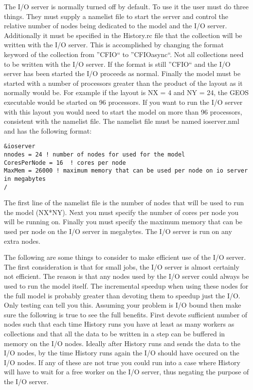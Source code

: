 The I/O server is normally turned off by default. To use it the user must do three things.
They must supply a namelist file to start the server and control the relative number of nodes being dedicated to the model and the I/O server.
Additionally it must be specified in the History.rc file that the collection will be written with the I/O server.
This is accomplished by changing the format keyword of the collection from ''CFIO`` to ''CFIOasync``.
Not all collections need to be written with the I/O server. If the format is still ''CFIO`` and the I/O server has been started the I/O proceeds as normal.
Finally the model must be started with a number of processors greater than the product of the layout as it normally would be.
For example if the layout is NX = 4 and NY = 24, the GEOS executable would be started on 96 processors.
If you want to run the I/O server with this layout you would need to start the model on more than 96 processors, consistent with the namelist file.
The namelist file must be named ioserver.nml and has the following format:
\begin{verbatim}
&ioserver
nnodes = 24 ! number of nodes for used for the model
CoresPerNode = 16  ! cores per node
MaxMem = 26000 ! maximum memory that can be used per node on io server in megabytes
/
\end{verbatim}
The first line of the namelist file is the number of nodes that will be used to run the model (NX*NY).
Next you must specify the number of cores per node you will be running on.
Finally you must specify the maximum memory that can be used per node on the I/O server in megabytes.
The I/O server is run on any extra nodes.

The following are some things to consider to make efficient use of the I/O server.
The first consideration is that for small jobs, the I/O server is almost certainly not efficient.
The reason is that any nodes used by the I/O server could always be used to run the model itself. The incremental speedup when using these nodes for the full model is probably greater than devoting them to speedup just the I/O.
Only testing can tell you this.
Assuming your problem is I/O bound then make sure the following is true to see the full benefits.
First devote sufficient number of nodes such that each time History runs you have at least as many workers as collections and that all the data to be written in a step can be buffered in memory on the I/O nodes. Ideally after History runs and sends the data to the I/O nodes, by the time History runs again the I/O should have occured on the I/O nodes.
If any of these are not true you could run into a case where History will have to wait for a free worker on the I/O server, thus negating the purpose of the I/O server.
